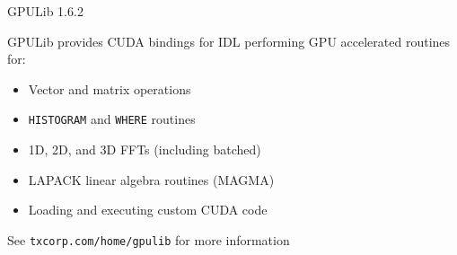 \documentclass[12pt, handout]{beamer}
\begin{document}
\appendix

\begin{frame}{GPULib 1.6.2}
\hypertarget{gpulib}{}

GPULib provides CUDA bindings for IDL performing GPU accelerated routines for:
\begin{itemize}
  \item Vector and matrix operations
  \item {\tt HISTOGRAM} and {\tt WHERE} routines
  \item 1D, 2D, and 3D FFTs (including batched)
  \item LAPACK linear algebra routines (MAGMA)
  \item Loading and executing custom CUDA code
\end{itemize}
See {\tt txcorp.com/home/gpulib} for more information

\hyperlink{examples}{}
\end{frame}
\end{document}
